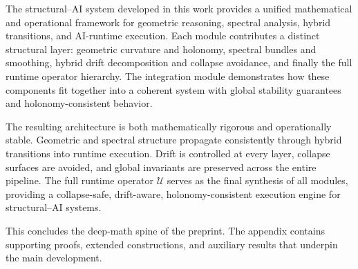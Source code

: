 \documentclass[11pt]{article}
\begin{document}
\begin{remark}
The structural--AI system developed in this work provides a unified
mathematical and operational framework for geometric reasoning, spectral
analysis, hybrid transitions, and AI-runtime execution. Each module
contributes a distinct structural layer: geometric curvature and holonomy,
spectral bundles and smoothing, hybrid drift decomposition and collapse
avoidance, and finally the full runtime operator hierarchy. The integration
module demonstrates how these components fit together into a coherent
system with global stability guarantees and holonomy-consistent behavior.

The resulting architecture is both mathematically rigorous and operationally
stable. Geometric and spectral structure propagate consistently through
hybrid transitions into runtime execution. Drift is controlled at every
layer, collapse surfaces are avoided, and global invariants are preserved
across the entire pipeline. The full runtime operator $\mathcal{U}$ serves
as the final synthesis of all modules, providing a collapse-safe,
drift-aware, holonomy-consistent execution engine for structural--AI
systems.

This concludes the deep-math spine of the preprint. The appendix contains
supporting proofs, extended constructions, and auxiliary results that
underpin the main development.
\end{remark}
\end{document}
